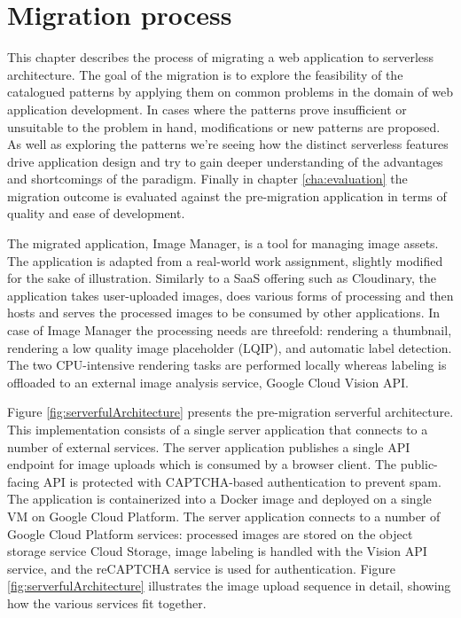 \chapter{Migration process}

This chapter describes the process of migrating a web application to serverless architecture. The goal of the migration is to explore the feasibility of the catalogued patterns by applying them on common problems in the domain of web application development. In cases where the patterns prove insufficient or unsuitable to the problem in hand, modifications or new patterns are proposed. As well as exploring the patterns we're seeing how the distinct serverless features drive application design and try to gain deeper understanding of the advantages and shortcomings of the paradigm. Finally in chapter \ref{cha:evaluation} the migration outcome is evaluated against the pre-migration application in terms of quality and ease of development.

The migrated application, Image Manager, is a tool for managing image assets. The application is adapted from a real-world work assignment, slightly modified for the sake of illustration. Similarly to a SaaS offering such as Cloudinary, the application takes user-uploaded images, does various forms of processing and then hosts and serves the processed images to be consumed by other applications. In case of Image Manager the processing needs are threefold: rendering a thumbnail, rendering a low quality image placeholder (LQIP), and automatic label detection. The two CPU-intensive rendering tasks are performed locally whereas labeling is offloaded to an external image analysis service, Google Cloud Vision API.


Figure \ref{fig:serverfulArchitecture} presents the pre-migration serverful architecture. This implementation consists of a single server application that connects to a number of external services. The server application publishes a single API endpoint for image uploads which is consumed by a browser client. The public-facing API is protected with CAPTCHA-based authentication to prevent spam. The application is containerized into a Docker image and deployed on a single VM on Google Cloud Platform. The server application connects to a number of Google Cloud Platform services: processed images are stored on the object storage service Cloud Storage, image labeling is handled with the Vision API service, and the reCAPTCHA service is used for authentication. Figure \ref{fig:serverfulArchitecture} illustrates the image upload sequence in detail, showing how the various services fit together.

